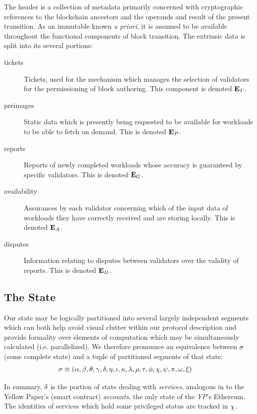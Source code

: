 The header is a collection of metadata primarily concerned with cryptographic references to the blockchain ancestors and the operands and result of the present transition. As an immutable known \emph{a priori}, it is assumed to be available throughout the functional components of block transition. The extrinsic data is split into its several portions:

\begin{description}
  \item[tickets] Tickets, used for the mechanism which manages the selection of validators for the permissioning of block authoring. This component is denoted $\mathbf{E}_T$.
  \item[preimages] Static data which is presently being requested to be available for workloads to be able to fetch on demand. This is denoted $\mathbf{E}_P$.
  \item[reports] Reports of newly completed workloads whose accuracy is guaranteed by specific validators. This is denoted $\mathbf{E}_G$.
  \item[availability] Assurances by each validator concerning which of the input data of workloads they have correctly received and are storing locally. This is denoted $\mathbf{E}_A$.
  \item[disputes] Information relating to disputes between validators over the validity of reports. This is denoted $\mathbf{E}_D$.
\end{description}

\subsection{The State}

Our state may be logically partitioned into several largely independent segments which can both help avoid visual clutter within our protocol description and provide formality over elements of computation which may be simultaneously calculated (i.e. parallelized). We therefore pronounce an equivalence between $\sigma$ (some complete state) and a tuple of partitioned segments of that state:
\begin{align}\label{eq:statecomposition}
  \thestate &\equiv \tup{\authpool, \recent, \lastaccout, \safrole, \accounts, \entropy, \stagingset, \activeset, \previousset, \availassignments, \thetime, \authqueue, \privileges, \disputes, \activity, \ready, \accumulated}
\end{align}

In summary, $\delta$ is the portion of state dealing with \emph{services}, analogous in \Jam to the Yellow Paper's (smart contract) \emph{accounts}, the only state of the \emph{YP}'s Ethereum. The identities of services which hold some privileged status are tracked in $\chi$.

